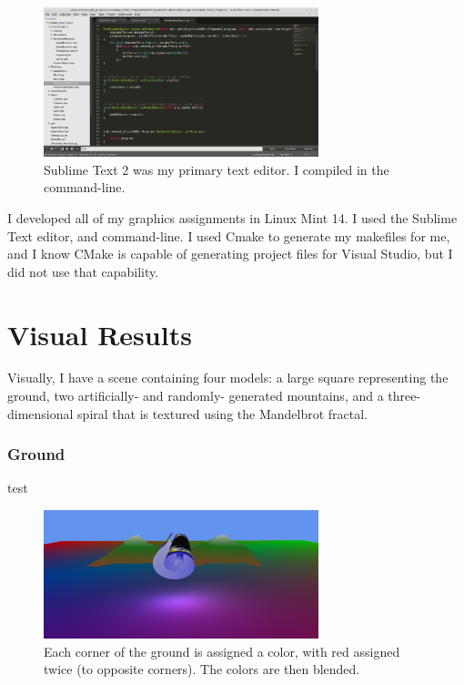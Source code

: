 \documentclass[journal]{IEEEtran}
\begin{document}
\begin{figure}[htbp]
\centering
\fbox
{
	\begin{minipage}{8 cm}
		\includegraphics[width=80mm]{resources/editing_in_sublime.png}
		\caption{Sublime Text 2 was my primary text editor. I compiled in the command-line.}
	\end{minipage}
}
\end{figure}

I developed all of my graphics assignments in Linux Mint 14. I used the Sublime Text editor, and command-line. I used Cmake to generate my makefiles for me, and I know CMake is capable of generating project files for Visual Studio, but I did not use that capability.

\section{Visual Results}

Visually, I have a scene containing four models: a large square representing the ground, two artificially- and randomly- generated mountains, and a three-dimensional spiral that is textured using the Mandelbrot fractal.

\subsubsection{Ground} test

\begin{figure}[htbp]
\centering
\fbox
{
	\begin{minipage}{8 cm}
		\includegraphics[width=80mm]{resources/screenshot1.png}
		\caption{Each corner of the ground is assigned a color, with red assigned twice (to opposite corners). The colors are then blended.}
	\end{minipage}
}
\end{figure}
\end{document}

